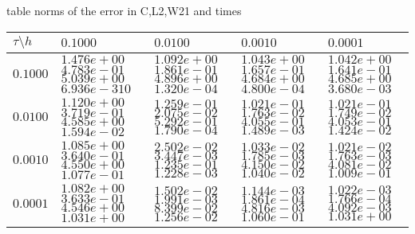 

\begin{center}
table norms of the error in C,L2,W21 and times
\\[2.0ex]  
  
\begin{tabular}{|p{0.6in}|p{0.7in}|p{0.7in}|p{0.7in}|p{0.7in}|} \hline
$\tau\setminus h$ & $0.1000$& $0.0100$& $0.0010$& $0.0001$\\ \hline

$0.1000$ & $1.476e+00$ $4.783e-01$ $5.039e+00$ $6.936e-310$ &$1.092e+00$ $1.861e-01$ $4.896e+00$ $1.320e-04$ &$1.043e+00$ $1.657e-01$ $4.684e+00$ $4.800e-04$ &$1.042e+00$ $1.641e-01$ $4.685e+00$ $3.680e-03$  \\ \hline
$0.0100$ & $1.120e+00$ $3.719e-01$ $4.585e+00$ $1.594e-02$ &$1.259e-01$ $2.075e-02$ $5.292e-01$ $1.790e-04$ &$1.021e-01$ $1.763e-02$ $4.055e-01$ $1.489e-03$ &$1.021e-01$ $1.749e-02$ $4.053e-01$ $1.424e-02$  \\ \hline
$0.0010$ & $1.085e+00$ $3.640e-01$ $4.550e+00$ $1.077e-01$ &$2.502e-02$ $3.447e-03$ $1.235e-01$ $1.228e-03$ &$1.033e-02$ $1.785e-03$ $4.150e-02$ $1.040e-02$ &$1.021e-02$ $1.763e-03$ $4.081e-02$ $1.009e-01$  \\ \hline
$0.0001$ & $1.082e+00$ $3.633e-01$ $4.546e+00$ $1.031e+00$ &$1.502e-02$ $1.991e-03$ $8.399e-02$ $1.256e-02$ &$1.144e-03$ $1.861e-04$ $4.816e-03$ $1.060e-01$ &$1.022e-03$ $1.766e-04$ $4.092e-03$ $1.031e+00$  \\ \hline
\end{tabular}\\[20pt]
\end{center}

